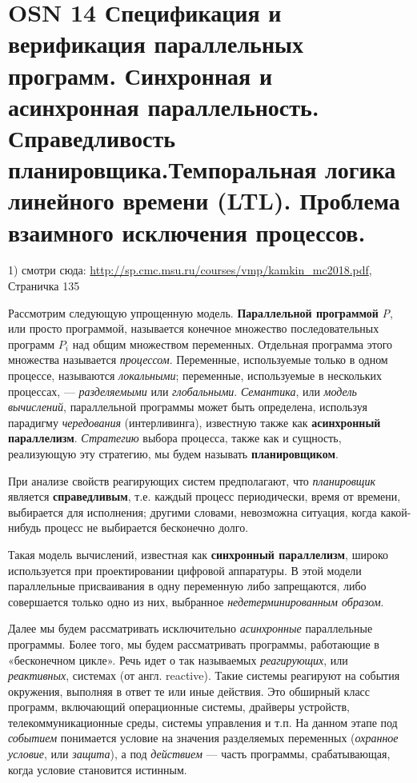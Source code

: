 \section*{OSN 14 Спецификация и верификация параллельных программ. Синхронная и асинхронная параллельность. Справедливость планировщика.Темпоральная логика линейного времени (LTL). Проблема взаимного исключения процессов.}

\text{}
\newline
\indent

1) смотри сюда: \url{http://sp.cmc.msu.ru/courses/vmp/kamkin_mc2018.pdf}, 
Страничка 135

Рассмотрим следующую упрощенную модель.
\textbf{Параллельной программой} \textit{P}, или просто программой, называется конечное множество последовательных программ \textit{$P_i$} над общим множеством переменных. 
Отдельная программа этого множества называется \textit{процессом}.
Переменные, используемые только в одном процессе, называются \textit{локальными}; переменные, используемые в нескольких процессах, — \textit{разделяемыми} или \textit{глобальными}.
\textit{Семантика}, или \textit{модель вычислений}, параллельной программы может быть определена, используя парадигму \textit{чередования} (интерливинга), известную также как \textbf{асинхронный параллелизм}. 
\textit{Стратегию} выбора процесса, также как и сущность, реализующую эту стратегию, мы будем называть \textbf{планировщиком}. 

При анализе свойств реагирующих систем предполагают, что \textit{планировщик} является \textbf{справедливым}, т.е. каждый процесс периодически, время от времени, выбирается для исполнения; другими словами, невозможна ситуация, когда какой-нибудь процесс не выбирается бесконечно долго.

Такая модель вычислений, известная как \textbf{синхронный параллелизм}, широко используется при проектировании цифровой аппаратуры. 
В этой модели параллельные присваивания в одну переменную либо запрещаются, либо совершается только одно из них, выбранное \textit{недетерминированным образом}.

Далее мы будем рассматривать исключительно \textit{асинхронные} параллельные программы. 
Более того, мы будем рассматривать программы, работающие в «бесконечном цикле». 
Речь идет о так называемых \textit{реагирующих}, или \textit{реактивных}, системах (от англ. reactive). 
Такие системы реагируют на события окружения, выполняя в ответ те или иные действия. 
Это обширный класс программ, включающий операционные системы, драйверы устройств, телекоммуникационные среды, системы управления и т.п.
На данном этапе под \textit{событием} понимается условие на значения разделяемых переменных (\textit{охранное условие}, или \textit{защита}), а под \textit{действием} — часть программы, срабатывающая, когда условие становится истинным. 


